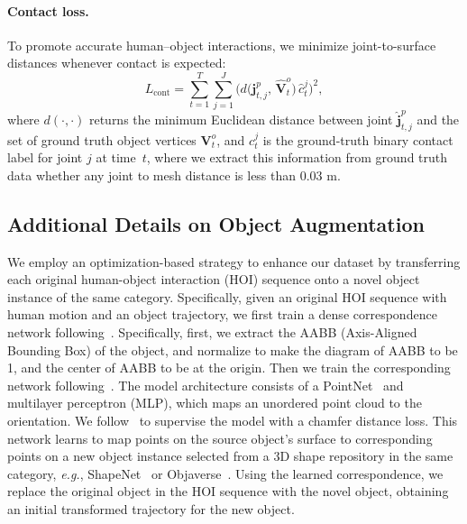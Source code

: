 \paragraph{Contact loss.}
To promote accurate human–object interactions, we minimize joint-to-surface distances whenever contact is expected:
\begin{equation}
  L_{\text{cont}}
  = \sum_{t=1}^{T}\sum_{j=1}^{J}
      \bigl(
        d\!\bigl(\boldsymbol{j}^{p}_{t,j},\,\hat{\boldsymbol{V}}^{o}_{t}\bigr)\,
        \hat{c}^{j}_{t}
      \bigr)^{2},
\end{equation}
where $d(\cdot,\cdot)$ returns the minimum Euclidean distance between joint $\hat{\boldsymbol{j}}^{p}_{t,j}$ and the set of ground truth object vertices ${\boldsymbol{V}}^{o}_{t}$, and ${c}^{j}_{t}$ is the ground-truth binary contact label for joint $j$ at time~$t$, where we extract this information from ground truth data whether any joint to mesh distance is less than 0.03 m.


\subsection{Additional Details on Object Augmentation} \label{sec:augmentation}


We employ an optimization-based strategy to enhance our dataset by transferring each original human-object interaction (HOI) sequence onto a novel object instance of the same category. Specifically, given an original HOI sequence with human motion and an object trajectory, we first train a dense correspondence network following~\citet{xie2024intertrack,zhou2022adjoint}. Specifically, first, we extract the AABB (Axis-Aligned Bounding Box) of the object, and normalize to make the diagram of AABB to be 1, and the center of AABB to be at the origin. Then we train the corresponding network following~\citet{zhou2022adjoint}. The model architecture consists of a PointNet~\citep{qi2017pointnet} and multilayer perceptron (MLP), which maps an unordered point cloud to the orientation. We follow~\citet{zhou2022adjoint} to supervise the model with a chamfer distance loss. This network learns to map points on the source object’s surface to corresponding points on a new object instance selected from a 3D shape repository in the same category, \textit{e.g.}, ShapeNet~\citep{chang2015shapenet} or Objaverse~\citep{deitke2023objaverse}. Using the learned correspondence, we replace the original object in the HOI sequence with the novel object, obtaining an initial transformed trajectory for the new object. 

